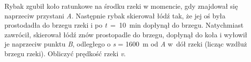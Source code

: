 Rybak zgubił koło ratunkowe na środku rzeki w momencie, gdy znajdował się naprzeciw przystani \emph{A}. Następnie rybak skierował łódź tak, że jej oś była prostodadła do brzegu rzeki i po \emph{t}~=~10~min dopłynął do brzegu. Natychmiast zawrócił, skierował łódź znów prostopadle do brzegu, dopłynął do koła i wyłowił je naprzeciw punktu \emph{B}, odległego o \emph{s} = 1600~m od \emph{A} w~dół rzeki (licząc wzdłuż brzegu rzeki). Obliczyć prędkość rzeki \emph{v}.
